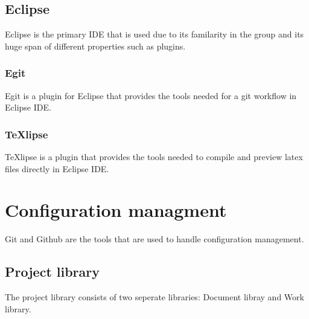 \documentclass{article}
\begin{document}
    \subsection{Eclipse}
        Eclipse is the primary IDE that is used due to its familarity in
        the group and its huge span of different properties such as plugins.
    
        \subsubsection{Egit}
            Egit is a plugin for Eclipse that provides the tools needed for a git workflow 
            in Eclipse IDE.
            
        \subsubsection{TeXlipse}
            TeXlipse is a plugin that provides the tools needed to compile and preview
            latex files directly in Eclipse IDE.
    

\section{Configuration managment}   %
    Git and Github are the tools that are used to handle configuration management.

    \subsection{Project library}
        The project library consists of two seperate libraries: Document libray and Work library.
    
\end{document}
